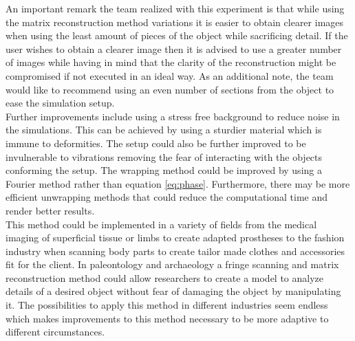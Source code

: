 An important remark the team realized with this experiment is that while using the matrix reconstruction method variations it is easier to obtain clearer images when using the least amount of pieces of the object while sacrificing detail. If the user wishes to obtain a clearer image then it is advised to use a greater number of images while having in mind that the clarity of the reconstruction might be compromised if not executed in an ideal way. As an additional note, the team would like to recommend using an even number of sections from the object to ease the simulation setup. \\

Further improvements include using a stress free background to reduce noise in the simulations. This can be achieved by using a sturdier material which is immune to deformities. The setup could also be further improved to be invulnerable to vibrations removing the fear of interacting with the objects conforming the setup. The wrapping method could be improved by using a Fourier method rather than equation \ref{eq:phase}. Furthermore, there may be more efficient unwrapping methods that could reduce the computational time and render better results. \\

This method could be implemented in a variety of fields from the medical imaging of superficial tissue or limbs to create adapted prostheses to the fashion industry when scanning body parts to create tailor made clothes and accessories fit for the client. In paleontology and archaeology a fringe scanning and matrix reconstruction method could allow researchers to create a model to analyze details of a desired object without fear of damaging the object by manipulating it. The possibilities to apply this method in different industries seem endless which makes improvements to this method necessary to be more adaptive to different circumstances.